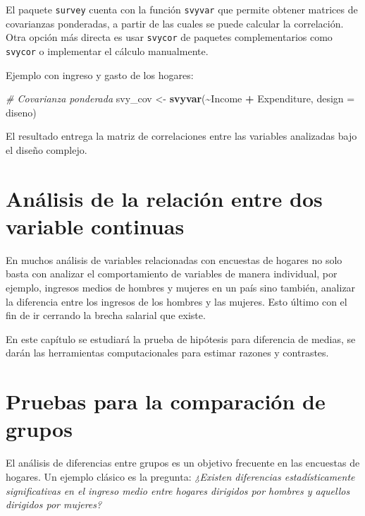 \documentclass[
  12pt,
]{book}
\newenvironment{Shaded}{\begin{snugshade}}{\end{snugshade}}
\newcommand{\AttributeTok}[1]{\textcolor[rgb]{0.13,0.29,0.53}{#1}}
\newcommand{\CommentTok}[1]{\textcolor[rgb]{0.56,0.35,0.01}{\textit{#1}}}
\newcommand{\FunctionTok}[1]{\textcolor[rgb]{0.13,0.29,0.53}{\textbf{#1}}}
\newcommand{\NormalTok}[1]{#1}
\newcommand{\OtherTok}[1]{\textcolor[rgb]{0.56,0.35,0.01}{#1}}
\newcommand{\SpecialCharTok}[1]{\textcolor[rgb]{0.81,0.36,0.00}{\textbf{#1}}}
\begin{document}
El paquete \texttt{survey} cuenta con la función \texttt{svyvar} que permite obtener matrices de covarianzas ponderadas, a partir de las cuales se puede calcular la correlación. Otra opción más directa es usar \texttt{svycor} de paquetes complementarios como \texttt{svycor} o implementar el cálculo manualmente.

Ejemplo con ingreso y gasto de los hogares:

\begin{Shaded}
\begin{Highlighting}[]
\CommentTok{\# Covarianza ponderada}
\NormalTok{svy\_cov }\OtherTok{\textless{}{-}} \FunctionTok{svyvar}\NormalTok{(}\SpecialCharTok{\textasciitilde{}}\NormalTok{Income }\SpecialCharTok{+}\NormalTok{ Expenditure, }\AttributeTok{design =}\NormalTok{ diseno)}
\end{Highlighting}
\end{Shaded}

El resultado entrega la matriz de correlaciones entre las variables analizadas bajo el diseño complejo.

\section{Análisis de la relación entre dos variable continuas}\label{anuxe1lisis-de-la-relaciuxf3n-entre-dos-variable-continuas}

En muchos análisis de variables relacionadas con encuestas de hogares no solo basta con analizar el comportamiento de variables de manera individual, por ejemplo, ingresos medios de hombres y mujeres en un país sino también, analizar la diferencia entre los ingresos de los hombres y las mujeres. Esto último con el fin de ir cerrando la brecha salarial que existe.

En este capítulo se estudiará la prueba de hipótesis para diferencia de medias, se darán las herramientas computacionales para estimar razones y contrastes.

\section{Pruebas para la comparación de grupos}\label{pruebas-para-la-comparaciuxf3n-de-grupos}

El análisis de diferencias entre grupos es un objetivo frecuente en las encuestas de hogares. Un ejemplo clásico es la pregunta: \emph{¿Existen diferencias estadísticamente significativas en el ingreso medio entre hogares dirigidos por hombres y aquellos dirigidos por mujeres?}
\end{document}
